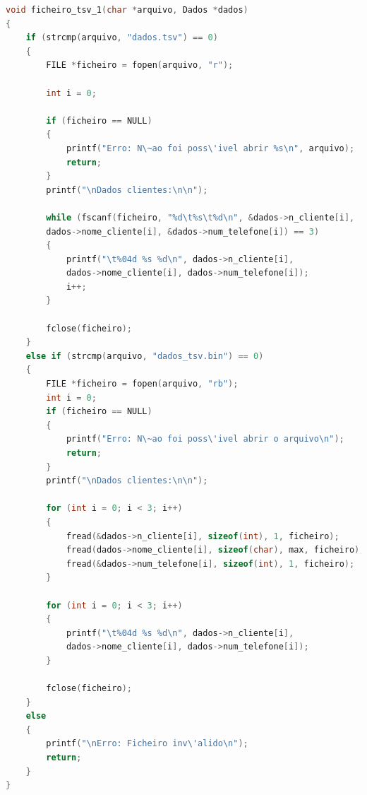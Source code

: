 \documentclass[a4wide]{report}
\begin{document}
\begin{lstlisting}[language=C, caption={ficheiro tsv 1}, label={codigo:c}]
void ficheiro_tsv_1(char *arquivo, Dados *dados)
{
    if (strcmp(arquivo, "dados.tsv") == 0)
    {
        FILE *ficheiro = fopen(arquivo, "r");

        int i = 0;
        
        if (ficheiro == NULL)
        {
            printf("Erro: N\~ao foi poss\'ivel abrir %s\n", arquivo);
            return;
        }
        printf("\nDados clientes:\n\n");

        while (fscanf(ficheiro, "%d\t%s\t%d\n", &dados->n_cliente[i], 
        dados->nome_cliente[i], &dados->num_telefone[i]) == 3)
        {
            printf("\t%04d %s %d\n", dados->n_cliente[i], 
            dados->nome_cliente[i], dados->num_telefone[i]);
            i++;
        }

        fclose(ficheiro);
    }
    else if (strcmp(arquivo, "dados_tsv.bin") == 0)
    {
        FILE *ficheiro = fopen(arquivo, "rb");
        int i = 0;
        if (ficheiro == NULL)
        {
            printf("Erro: N\~ao foi poss\'ivel abrir o arquivo\n");
            return;
        }
        printf("\nDados clientes:\n\n");

        for (int i = 0; i < 3; i++)
        {
            fread(&dados->n_cliente[i], sizeof(int), 1, ficheiro);
            fread(dados->nome_cliente[i], sizeof(char), max, ficheiro);
            fread(&dados->num_telefone[i], sizeof(int), 1, ficheiro);
        }

        for (int i = 0; i < 3; i++)
        {
            printf("\t%04d %s %d\n", dados->n_cliente[i],  
            dados->nome_cliente[i], dados->num_telefone[i]);
        }

        fclose(ficheiro);
    }
    else
    {
        printf("\nErro: Ficheiro inv\'alido\n");
        return;
    }
}
\end{lstlisting}
\end{document}
